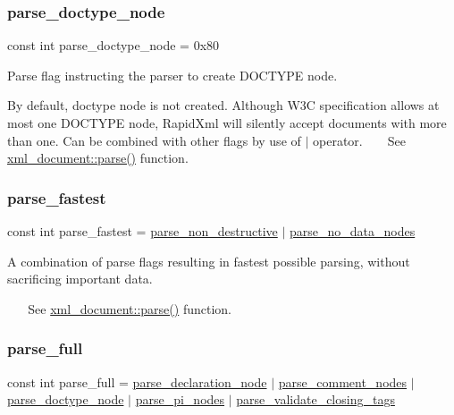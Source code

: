 \subsubsection{\texorpdfstring{parse\+\_\+doctype\+\_\+node}{parse\_doctype\_node}}
{\footnotesize\ttfamily const int parse\+\_\+doctype\+\_\+node = 0x80}



Parse flag instructing the parser to create D\+O\+C\+T\+Y\+PE node. 

By default, doctype node is not created. Although W3C specification allows at most one D\+O\+C\+T\+Y\+PE node, Rapid\+Xml will silently accept documents with more than one. Can be combined with other flags by use of $\vert$ operator. ~\newline
~\newline
 See \mbox{\hyperlink{classrapidxml_1_1xml__document_aa280fd704731128b4556b41c1e9182b8}{xml\+\_\+document\+::parse()}} function. \mbox{\label{namespacerapidxml_a398c5476e76102f8bd76c10bb0abbe10}} 
\subsubsection{\texorpdfstring{parse\+\_\+fastest}{parse\_fastest}}
{\footnotesize\ttfamily const int parse\+\_\+fastest = \mbox{\hyperlink{namespacerapidxml_aa97ba1a0a79a6d66f4eef3612508d943}{parse\+\_\+non\+\_\+destructive}} $\vert$ \mbox{\hyperlink{namespacerapidxml_a87e8bbab53702cf3b438bd553c10b6b9}{parse\+\_\+no\+\_\+data\+\_\+nodes}}}



A combination of parse flags resulting in fastest possible parsing, without sacrificing important data. 

~\newline
~\newline
 See \mbox{\hyperlink{classrapidxml_1_1xml__document_aa280fd704731128b4556b41c1e9182b8}{xml\+\_\+document\+::parse()}} function. \mbox{\label{namespacerapidxml_ab4f2515265facb42291570307924bd57}} 
\subsubsection{\texorpdfstring{parse\+\_\+full}{parse\_full}}
{\footnotesize\ttfamily const int parse\+\_\+full = \mbox{\hyperlink{namespacerapidxml_a52e2c934ad9c845a5f4cc49570470556}{parse\+\_\+declaration\+\_\+node}} $\vert$ \mbox{\hyperlink{namespacerapidxml_a0f7479dacbc868456d07897a8c072784}{parse\+\_\+comment\+\_\+nodes}} $\vert$ \mbox{\hyperlink{namespacerapidxml_a8e187746ba1ca04f107951ad32df962e}{parse\+\_\+doctype\+\_\+node}} $\vert$ \mbox{\hyperlink{namespacerapidxml_a1c20b2b2b75711cd76423e119c49f830}{parse\+\_\+pi\+\_\+nodes}} $\vert$ \mbox{\hyperlink{namespacerapidxml_aa5daff9d61c7d4eaf98e4d42efe628ee}{parse\+\_\+validate\+\_\+closing\+\_\+tags}}}



